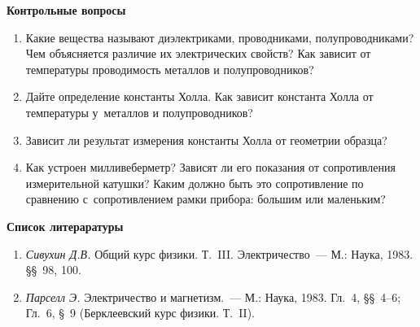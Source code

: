 {\small

{\bf \Large Контрольные вопросы}

\begin{enumerate}

\item{ Какие вещества называют диэлектриками, проводниками, полупроводниками? Чем объясняется различие их электрических свойств? Как зависит от температуры проводимость металлов и полупроводников?}

\item{ Дайте определение константы Холла. Как зависит константа Холла от температуры у~металлов и полупроводников?}

\item{ Зависит ли результат измерения константы Холла от геометрии образца?}

\item{ Как устроен милливеберметр? Зависят ли его показания от сопротивления измерительной катушки? Каким должно быть это сопротивление по сравнению с~сопротивлением рамки прибора: большим или маленьким?}

\end{enumerate}

{\bf \Large Список литераратуры}

\begin{enumerate}


\item{ \emph{Сивухин Д.В.} Общий курс физики. Т.~III. Электричество~--- М.: Наука, 1983. \S\S~98, 100.}

\item{ \emph{Парселл Э.} Электричество и магнетизм.~--- М.: Наука, 1983. Гл.~4, \S\S~4--6; Гл.~6, \S~9 (Берклеевский курс физики. Т.~II).}
\end{enumerate}

}


